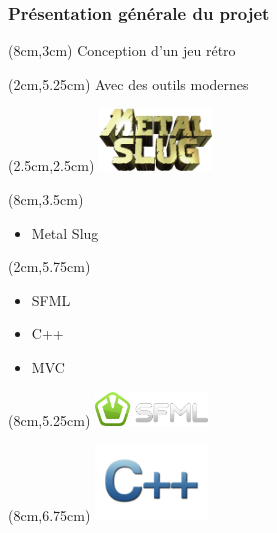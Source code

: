 \begin{frame}
	
	\frametitle{Présentation générale du projet}
	
	
	
	\begin{textblock*}{5cm}(8cm,3cm)
		Conception d'un jeu rétro
	\end{textblock*}
	
	\begin{textblock*}{5cm}(2cm,5.25cm)
		Avec des outils modernes
	\end{textblock*}
	
	{
		\begin{textblock*}{3cm}(2.5cm,2.5cm)
			\includegraphics[width=3cm]{figures/logo_metal_slug.png}
		\end{textblock*}
	
		\begin{textblock*}{5cm}(8cm,3.5cm)
			\begin{itemize}
				[triangle]
				\item Metal Slug
			\end{itemize}
		\end{textblock*}
	}
	
	{
		\begin{textblock*}{5cm}(2cm,5.75cm)
			\begin{itemize}
				\item SFML
			\end{itemize}
			\begin{itemize}
				\item C++
			\end{itemize}
			\begin{itemize}
				\item MVC
			\end{itemize}
		\end{textblock*}
	
		\begin{textblock*}{3cm}(8cm,5.25cm)
			\includegraphics[width=3cm]{figures/logo_sfml.png}
		\end{textblock*}
	
		\begin{textblock*}{3cm}(8cm,6.75cm)
			\includegraphics[width=3cm]{figures/logo_c++.png}
		\end{textblock*}
	}
	
\end{frame}
